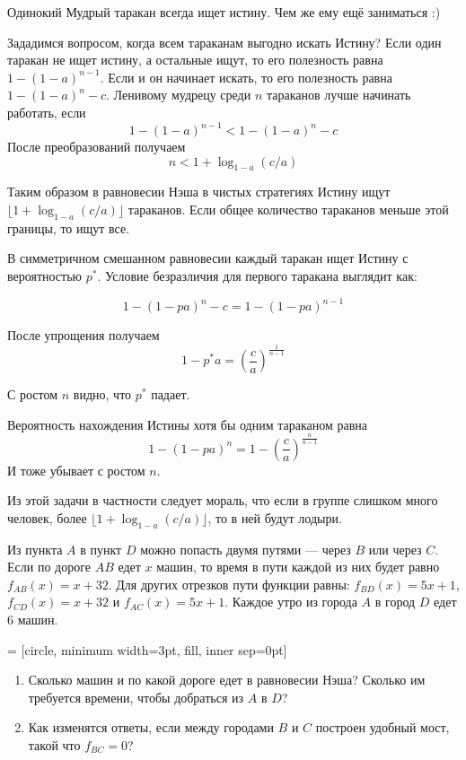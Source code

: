 \begin{solution}
Одинокий Мудрый таракан всегда ищет истину. Чем же ему ещё заниматься :)

Зададимся вопросом, когда всем тараканам выгодно искать Истину?
Если один таракан не ищет истину, а остальные ищут, то его полезность равна $1-(1-a)^{n-1}$. Если и он начинает искать, то его полезность равна $1-(1-a)^n-c$. Ленивому мудрецу среди $n$ тараканов лучше начинать работать, если 
\[
1-(1-a)^{n-1} < 1-(1-a)^n-c
\]
После преобразований получаем
\[
n< 1 + \log_{1-a}(c/a)
\]

Таким образом в равновесии Нэша в чистых стратегиях Истину ищут $\lfloor 1 + \log_{1-a}(c/a) \rfloor$ тараканов. Если общее количество тараканов меньше этой границы, то ищут все.

В симметричном смешанном равновесии каждый таракан ищет Истину с вероятностью $p^*$.  Условие безразличия для первого таракана выглядит как:

\[
1-(1-pa)^n-c=1-(1-pa)^{n-1}
\]

После упрощения получаем
\[
1-p^{*}a=\left(\frac{c}{a}\right)^{\frac{1}{n-1}}
\]

С ростом $n$ видно, что $p^*$ падает.

Вероятность нахождения Истины хотя бы одним тараканом равна
\[
1-(1-pa)^n=1-\left(\frac{c}{a}\right)^{\frac{n}{n-1}}
\]
И тоже убывает с ростом $n$.

Из этой задачи в частности следует мораль, что если в группе слишком много человек, более $\lfloor 1 + \log_{1-a}(c/a) \rfloor$, то в ней будут лодыри.

\end{solution}

\begin{problem}
Из пункта $A$ в пункт $D$ можно попасть двумя путями --- через $B$ или
через $C$. Если по дороге $AB$ едет $x$ машин, то время в пути каждой
из них будет равно $f_{AB}(x)=x+32$. Для других отрезков пути
функции равны: $f_{BD}(x)=5x+1$, $f_{CD}(x)=x+32$ и
$f_{AC}(x)=5x+1$.
Каждое утро из города $A$ в город $D$ едет 6 машин. 

 = [circle, minimum width=3pt, fill, inner sep=0pt]



\begin{enumerate}
\item Сколько машин и по какой дороге едет в равновесии  Нэша?
Сколько им требуется времени, чтобы добраться из $A$ в $D$? 
\item  Как изменятся ответы, если между городами $B$ и $C$ построен удобный мост, такой что $f_{BC}=0$? 
\end{enumerate}
\end{problem}

